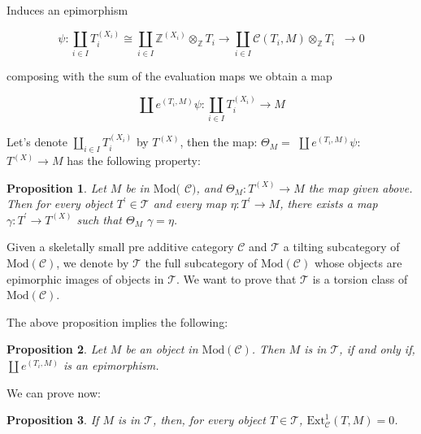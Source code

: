 \documentclass{amsart}
\theoremstyle{plain}
\newtheorem{proposition}{Proposition}
\numberwithin{equation}{section}
\begin{document}
\bigskip Induces an epimorphism

\begin{equation*}
\psi :\coprod_{i\in I}T_{i}^{(X_{i})}\cong \coprod_{i\in I}\mathbb{Z}^{(X_{i})}\otimes _{\mathbb{Z}}T_{i}\rightarrow \coprod_{i\in I}\mathcal{C}(T_{i},M)\otimes _{\mathbb{Z}}T_{i}\;\;\rightarrow 0
\end{equation*}

composing with the sum of the evaluation maps we obtain a map

\begin{equation*}
\coprod e^{(T_{i},M)}\psi :\coprod_{i\in I}T_{i}^{(X_{i})}\rightarrow M
\end{equation*}

\bigskip Let's denote $\coprod_{i\in I}T_{i}^{(X_{i})}$ by $T^{(X)}$, then
the map: $\varTheta_{M}=$ $\coprod e^{(T_{i},M)}\psi :$ $T^{(X)}\rightarrow
M $ has the following property:

\begin{proposition}
\label{Catilt} Let $M$ be in $\mathrm{Mod}($ $\mathcal{C)}$, and $\varTheta
_{M}:T^{(X)}\rightarrow M$ the map given above. Then for every object $T^{\prime }\in \mathcal{T}$ and every map $\eta :T^{\prime }\rightarrow M$,
there exists a map $\gamma :T^{\prime }\rightarrow T^{(X)}$ such that $\varTheta_{M}$ $\gamma =\eta $.
\end{proposition}

Given a skeletally small pre additive category $\mathcal{C}$ and $\mathcal{T}
$ a tilting subcategory of $\mathrm{\mathrm{Mod}}(\mathcal{C})$, we denote
by $\mathscr{T}$ the full subcategory of $\mathrm{\mathrm{Mod}}(\mathcal{C})$
whose objects are epimorphic images of objects in $\mathcal{T}$. We want to
prove that $\mathscr T$ is a torsion class of $\mathrm{\mathrm{Mod}}(\mathcal{C})$.

The above proposition implies the following:

\begin{proposition}
\label{TORD} Let $M$ be an object in $\mathrm{\mathrm{Mod}}(\mathcal{C})$.
Then $M$ is in $\mathscr T$, if and only if, $\coprod e^{(T_i,M)}$ is an
epimorphism.
\end{proposition}

We can prove now:

\begin{proposition}
\label{TORC} If $M$ is in $\mathscr T$, then, for every object $T\in
\mathcal{T}$, $\mathrm{Ext}_{\mathcal{C}}^{1}(T,M)=0$.
\end{proposition}
\end{document}
